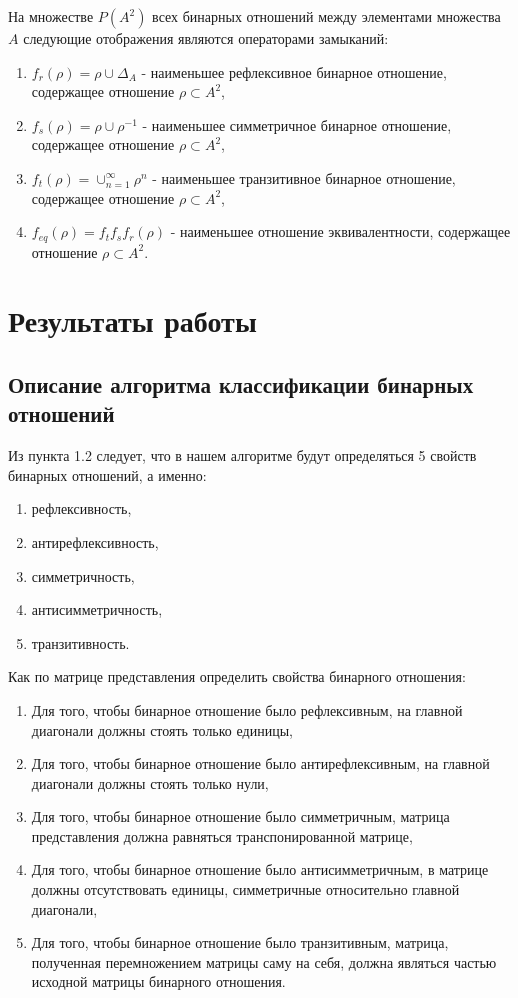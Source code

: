 \documentclass[bachelor, och, labwork]{shiza}
\begin{document}
	На множестве $P(A^2)$ всех бинарных отношений между элементами множества $A$ следующие отображения являются операторами замыканий:

	\begin{enumerate}
		\item $f_r(\rho) = \rho \cup \Delta_A$ - наименьшее рефлексивное бинарное отношение, содержащее отношение $\rho \subset A^2$,
		\item $f_s(\rho) = \rho \cup \rho^{-1}$ - наименьшее симметричное бинарное отношение, содержащее отношение $\rho \subset A^2$,
		\item $f_t(\rho) = \cup_{n=1}^{\infty}\rho^n $ - наименьшее транзитивное бинарное отношение, содержащее отношение $\rho \subset A^2$,
		\item $f_{eq}(\rho) = f_{t}f_{s} f_{r}(\rho)$ - наименьшее отношение эквивалентности, содержащее отношение $\rho \subset A^2$.
	\end{enumerate}
	
	
	\section{Результаты работы}
	\subsection{Описание алгоритма классификации бинарных отношений}
	
	Из пункта 1.2 следует, что в нашем алгоритме будут определяться 5 свойств бинарных отношений, а именно:
	
	\begin{enumerate}
		\item рефлексивность,
		\item антирефлексивность,
		\item симметричность,
		\item антисимметричность,
		\item транзитивность.
	\end{enumerate}
	
		Как по матрице представления определить свойства бинарного отношения:
	\begin{enumerate}
		\item Для того, чтобы бинарное отношение было $\textit{рефлексивным}$, на главной  диагонали должны стоять только единицы,
		\item Для того, чтобы бинарное отношение было $\textit{антирефлексивным}$, на главной  диагонали должны стоять только нули,
		\item Для того, чтобы бинарное отношение было $\textit{симметричным}$, матрица представления должна равняться транспонированной матрице,
		\item Для того, чтобы бинарное отношение было $\textit{антисимметричным}$, в матрице должны отсутствовать единицы, симметричные относительно главной диагонали,
		\item Для того, чтобы бинарное отношение было $\textit{транзитивным}$, матрица, полученная перемножением матрицы саму на себя, должна являться частью исходной матрицы бинарного отношения.

	\end{enumerate}
				
\end{document}
